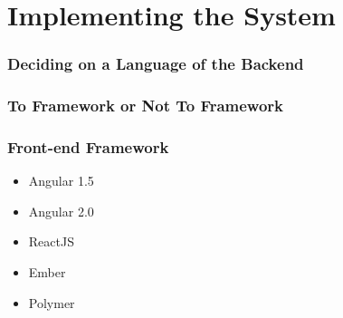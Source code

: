 \chapter{Implementing the System}
	
	\subsection{Deciding on a Language of the Backend}
	\subsection{To Framework or Not To Framework}


	\subsection{Front-end Framework}
		\begin{itemize}
			\item Angular 1.5
			\item Angular 2.0
			\item ReactJS
			\item Ember
			\item Polymer
		\end{itemize}